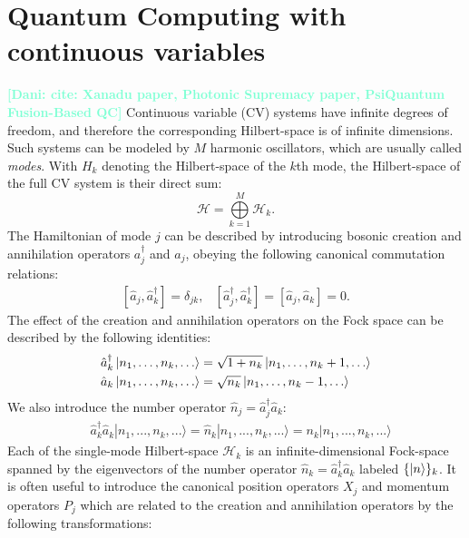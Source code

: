 \documentclass[12pt, a4paper,  nobibnotes]{article}
\newcommand{\op}[1]{\hat{#1}}
\newcommand{\nd}[1]{\textcolor{Aquamarine}{\textbf{[Dani: #1]}}}
\begin{document}
\section{Quantum Computing with continuous variables}
\nd{cite: Xanadu paper, Photonic Supremacy paper, PsiQuantum Fusion-Based QC}
Continuous variable (CV) systems have infinite degrees of freedom, and therefore the corresponding Hilbert-space is of infinite dimensions. 
Such systems can be modeled by $M$ harmonic oscillators, which are usually called \textit{modes}. 
With $H_k$ denoting the Hilbert-space of the $k$th mode, the Hilbert-space of the full CV system is their direct sum:
\begin{equation}
    \mathcal H = \bigoplus\limits_{k=1}^M\mathcal H_k.
\end{equation}
The Hamiltonian of mode $j$ can be described by introducing bosonic creation and annihilation operators $a_j^\dagger$ and $a_j$, obeying the following canonical commutation relations:
\begin{align}
    \left[\op a_j, \op a_k^\dagger \right] = \delta_{jk}, & \left[\op a_j^\dagger, \op a_k^\dagger\right] = \left[\op a_j, \op a_k\right] = 0.
\end{align}
The effect of the creation and annihilation operators on the Fock space can be described by the 
following identities:
\begin{align}
    \begin{split}
    &\op a_k^{\dagger} \ket{n_1, \dots, n_k, \dots} = \sqrt{1+n_k}\ket{n_1, \dots, n_k + 1, \dots} \\
    &\op a_k \ket{n_1, \dots, n_k, \dots} = \sqrt{n_k} \ket{n_1, \dots, n_k - 1, \dots} \\
    \end{split}
\end{align}
We also introduce the number operator $\op n_j=\op a_j^\dagger \op a_k$:
\begin{align}
 &\op a_k^\dagger \op a_k |n_1, ..., n_k, ... \rangle = \op n_k |n_1, ..., n_k, ... \rangle = n_k |n_1, ..., n_k, ... \rangle
\end{align}
Each of the single-mode Hilbert-space $\mathcal H_k$ is an infinite-dimensional Fock-space spanned by the eigenvectors 
of the number operator $\op n_k = \op a_k^\dagger \op a_k$ labeled $\{\ket{n}\}_k$.
It is often useful to introduce the canonical position operators $X_j$ and momentum operators $P_j$ which are related to the creation and annihilation operators
by the following transformations:
\end{document}
